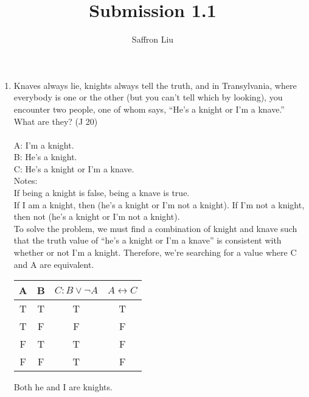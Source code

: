 \documentclass{article}
\title{Submission 1.1}
\author{Saffron Liu}
\date{}
\begin{document}
\maketitle

\begin{enumerate}
      \item Knaves always lie, knights always tell the truth, and in Transylvania, where everybody is one or the other (but you can't tell which by looking), you encounter two people, one of whom says, “He's a knight or I'm a knave.” What are they? (J 20)\\\\
            A: I'm a knight.\\
            B: He's a knight.\\
            C: He's a knight or I'm a knave.\\
            Notes:\\
            If being a knight is false, being a knave is true.\\
            If I am a knight, then (he's a knight or I'm not a knight). If I'm not a knight, then not (he's a knight or I'm not a knight).\\
            To solve the problem, we must find a combination of knight and knave such that the truth value of “he's a knight or I'm a knave” is consistent with whether or not I'm a knight. Therefore, we're searching for a value where C and A are equivalent.\\
            \begin{tabular}{c|c|c|c}
                  A & B & $C: B \lor \neg A$ & $A \leftrightarrow C$ \\
                  \hline
                  T & T & T                  & T                     \\
                  T & F & F                  & F                     \\
                  F & T & T                  & F                     \\
                  F & F & T                  & F                     \\
            \end{tabular}
            Both he and I are knights.
\end{enumerate}
\end{document}
